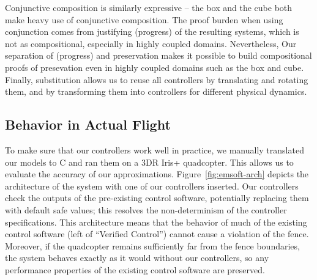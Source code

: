 Conjunctive composition is similarly expressive -- the box and the cube
both make heavy use of conjunctive composition.  The proof burden when
using conjunction comes from justifying \progress{} (progress) of the
resulting systems, which is not as compositional, especially in highly
coupled domains.  Nevertheless, Our separation of \progress{} (progress)
and preservation makes it possible to build compositional proofs of
presevation even in highly coupled domains such as the box and cube.
Finally, substitution allows us to reuse all controllers by translating and
rotating them, and by transforming them into controllers for different
physical dynamics.

\subsection{Behavior in Actual Flight}
\label{sec:flight}
To make sure that our controllers work well in practice, we manually
translated our models to C and ran them on a 3DR Iris+ quadcopter.  This
allows us to evaluate the accuracy of our approximations.
Figure~\ref{fig:emsoft-arch} depicts the architecture of the system with one of
our controllers inserted.  Our controllers check the outputs of the
pre-existing control software, potentially replacing them with default safe
values; this resolves the non-determinism of the controller specifications.
This architecture means that the behavior of much of the existing control
software (left of ``Verified Control'') cannot cause a violation of the
fence.  Moreover, if the quadcopter remains sufficiently far from the fence
boundaries, the system behaves exactly as it would without our controllers,
so any performance properties of the existing control software are
preserved.

